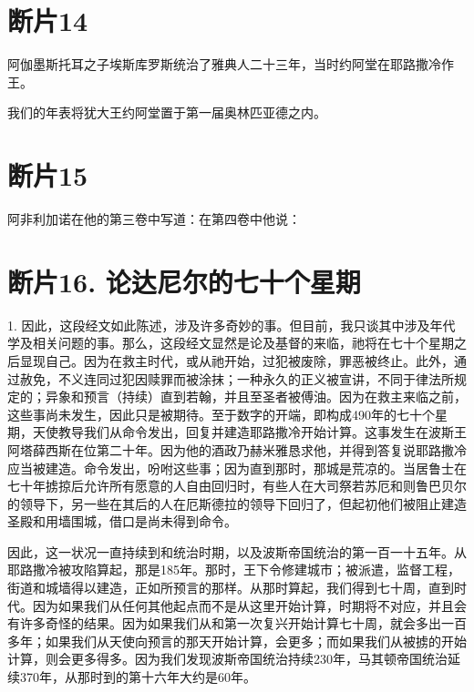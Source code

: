 
\section{断片14}

阿伽墨斯托耳之子埃斯库罗斯统治了雅典人二十三年，当时约阿堂在耶路撒冷作王。\par

我们的年表将犹大王约阿堂置于第一届奥林匹亚德之内。\par


\section{断片15}

阿非利加诺在他的第三卷中写道：在第四卷中他说：\par


\section{断片16. 论达尼尔的七十个星期}

1. 因此，这段经文如此陈述，涉及许多奇妙的事。但目前，我只谈其中涉及年代学及相关问题的事。那么，这段经文显然是论及基督的来临，祂将在七十个星期之后显现自己。因为在救主时代，或从祂开始，过犯被废除，罪恶被终止。此外，通过赦免，不义连同过犯因赎罪而被涂抹；一种永久的正义被宣讲，不同于律法所规定的；异象和预言（持续）直到若翰，并且至圣者被傅油。因为在救主来临之前，这些事尚未发生，因此只是被期待。至于数字的开端，即构成490年的七十个星期，天使教导我们从命令发出，回复并建造耶路撒冷开始计算。这事发生在波斯王阿塔薛西斯在位第二十年。因为他的酒政乃赫米雅恳求他，并得到答复说耶路撒冷应当被建造。命令发出，吩咐这些事；因为直到那时，那城是荒凉的。当居鲁士在七十年掳掠后允许所有愿意的人自由回归时，有些人在大司祭若苏厄和则鲁巴贝尔的领导下，另一些在其后的人在厄斯德拉的领导下回归了，但起初他们被阻止建造圣殿和用墙围城，借口是尚未得到命令。\par

因此，这一状况一直持续到和统治时期，以及波斯帝国统治的第一百一十五年。从耶路撒冷被攻陷算起，那是185年。那时，王下令修建城市；被派遣，监督工程，街道和城墙得以建造，正如所预言的那样。从那时算起，我们得到七十周，直到时代。因为如果我们从任何其他起点而不是从这里开始计算，时期将不对应，并且会有许多奇怪的结果。因为如果我们从和第一次复兴开始计算七十周，就会多出一百多年；如果我们从天使向预言的那天开始计算，会更多；而如果我们从被掳的开始计算，则会更多得多。因为我们发现波斯帝国统治持续230年，马其顿帝国统治延续370年，从那时到的第十六年大约是60年。\par

